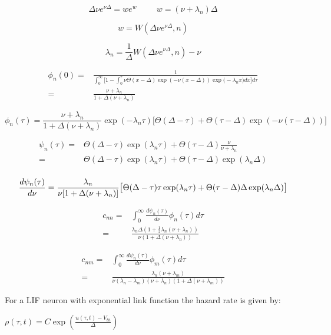 \documentclass[a4paper,12pt,twoside]{article}
\def \be {\begin{equation}}
\def \ee {\end{equation}}
\begin{document}
\be
\Delta \nu e^{\nu\Delta}=we^{w} \hspace{1cm} w=(\nu+\lambda_n)\Delta
\ee

\be
w=W(\Delta \nu e^{\nu\Delta},n)
\ee

\be
\lambda_n=\frac{1}{\Delta}W(\Delta \nu e^{\nu\Delta},n) - \nu
\ee

\begin{align}
\phi_n(0) =&\frac{1}{\int_0^{\infty}\big[1-\int^\tau_0 \nu \Theta(x-\Delta) \exp(-\nu(x-\Delta)) \exp\big(-\lambda_nx)dx\big]d\tau}\\
=& \frac{\nu+\lambda_n}{1+\Delta(\nu+\lambda_n)}
\end{align}

\be
\phi_n(\tau)= \frac{\nu+\lambda_n}{1+\Delta(\nu+\lambda_n)}\exp(-\lambda_n\tau)\big[\Theta(\Delta-\tau) +  \Theta(\tau-\Delta) \exp(-\nu(\tau-\Delta))\big]
\ee


\begin{align}
\psi_n(\tau)=&\Theta(\Delta-\tau)\exp(\lambda_n\tau) +  \Theta(\tau-\Delta) \frac{\nu}{\nu+\lambda_n}\\
=&\Theta(\Delta-\tau)\exp(\lambda_n\tau) +  \Theta(\tau-\Delta) \exp(\lambda_n\Delta)\\
\end{align}


\be
\frac{d\psi_n(\tau)}{d\nu}=\frac{\lambda_n}{\nu[1+\Delta(\nu+\lambda_n)]}\big[\Theta(\Delta-\tau)\tau\exp(\lambda_n\tau) +  \Theta(\tau-\Delta)\Delta \exp(\lambda_n\Delta)\big]\\
\ee


\begin{align}
c_{nn}=&\int_0^\infty\frac{d\psi_n(\tau)}{d\nu}\phi_n(\tau)d\tau\\
=&\frac{\lambda_n\Delta(1+\frac{1}{2}\lambda_n(\nu+\lambda_n))}{\nu(1+\Delta(\nu+\lambda_n))}
\end{align}


\begin{align}
c_{nm}=&\int_0^\infty\frac{d\psi_n(\tau)}{d\nu}\phi_m(\tau)d\tau\\
=&\frac{\lambda_n(\nu+\lambda_m)}{\nu(\lambda_n-\lambda_m)(\nu+\lambda_n)(1+\Delta(\nu+\lambda_m))}
\end{align}






For a LIF neuron with exponential link function the hazard rate is given by:

$\rho(\tau,t)=C\exp(\frac{u(\tau,t)-V_{th}}{\Delta})$
\end{document}
